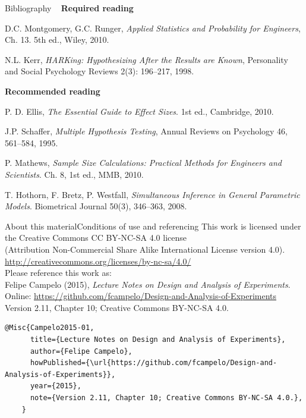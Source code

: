 \documentclass[t]{beamer}
\begin{document}
\begin{ftst}
{Bibliography}
{\ }
\scriptsize
\textbf{Required reading}

\benums  D.C. Montgomery, G.C. Runger, \textit{Applied Statistics and Probability for Engineers}, Ch. 13. 5th ed., Wiley, 2010.
\item N.L. Kerr, \textit{HARKing: Hypothesizing After the Results are Known}, Personality and Social Psychology Reviews 2(3): 196--217, 1998.
\eenum

\textbf{Recommended reading}

\benums P. D. Ellis, \textit{The Essential Guide to Effect Sizes}. 1st ed., Cambridge, 2010.
\item J.P. Schaffer, \textit{Multiple Hypothesis Testing}, Annual Reviews on Psychology 46, 561--584, 1995.
\item P. Mathews, \textit{Sample Size Calculations: Practical Methods for Engineers and Scientists}. Ch. 8, 1st ed., MMB, 2010.
\item T. Hothorn, F. Bretz, P. Westfall, \textit{Simultaneous Inference in General Parametric Models}. Biometrical  Journal 50(3), 346--363, 2008.
\eenum
\end{ftst}


\begin{ftstf}{About this material}{Conditions of use and referencing}
\centering\footnotesize This work is licensed under the Creative Commons CC BY-NC-SA 4.0 license\\(Attribution Non-Commercial Share Alike International License version 4.0).\\
\vhalf
\url{http://creativecommons.org/licenses/by-nc-sa/4.0/}\\
\vone
\footnotesize Please reference this work as:\\
\footnotesize \flushleft Felipe Campelo (2015), \textit{Lecture Notes on Design and Analysis of Experiments}.\\Online: {\scriptsize\url{https://github.com/fcampelo/Design-and-Analysis-of-Experiments}}\\
Version 2.11, Chapter 10; Creative Commons BY-NC-SA 4.0.\\

\begin{Verbatim}[fontsize=\tiny]
    @Misc{Campelo2015-01,
      title={Lecture Notes on Design and Analysis of Experiments},
      author={Felipe Campelo},
      howPublished={\url{https://github.com/fcampelo/Design-and-Analysis-of-Experiments}},
      year={2015},
      note={Version 2.11, Chapter 10; Creative Commons BY-NC-SA 4.0.},
    }
\end{Verbatim}

\end{ftstf}
\end{document}
